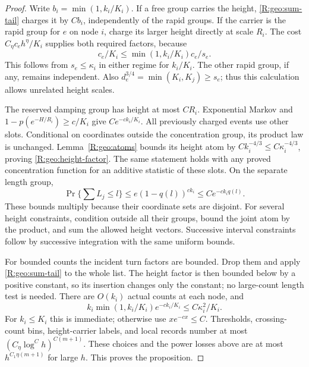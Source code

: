 \begin{proof}
Write $b_i=\min(1,k_i/K_i)$.  If a free group carries the height,
\eqref{R:geo:sum-tail} charges it by $Cb_i$, independently of the
rapid groups.  If the carrier is the rapid group for $e$ on node $i$,
charge its larger height directly at scale $R_i$.  The cost
$C_\eta c_eh^\eta/K_i$ supplies both required factors, because
\begin{equation}\label{R:geo:shared-height-charge}
              c_e/K_i\le \min(1,k_i/K_i)c_e/s_e.
\end{equation}
This follows from $s_e\le\kappa_i$ in either regime for $k_i/K_i$.
The other rapid group, if any, remains independent.  Also
$d_e^{3/4}=\min(K_i,K_j)\ge s_e$; thus this calculation allows
unrelated height scales.

The reserved damping group has height at most $CR_i$.  Exponential
Markov and $1-p(e^{-H/R_i})\ge c/K_i$ give
$C e^{-c k_i/K_i}$.  All previously charged events use other slots.
Conditional on coordinates outside the concentration group, its product
law is unchanged.  Lemma~\ref{R:geo:atoms} bounds its height atom by
$Ck_i^{-4/3}\le C\kappa_i^{-4/3}$, proving
\eqref{R:geo:height-factor}.  The same statement holds with any proved
concentration function for an additive statistic of these slots.  On
the separate length group,
\[
 \Pr\{\textstyle\sum L_j\le l\}
       \le e(1-q(l))^{c k_i}\le C e^{-c k_i q(l)}.
\]
These bounds multiply because their coordinate sets are disjoint.
For several height constraints, condition outside all their groups,
bound the joint atom by the product, and sum the allowed height vectors.
Successive interval constraints follow by successive integration with
the same uniform bounds.

For bounded counts the incident turn factors are bounded.  Drop them
and apply \eqref{R:geo:sum-tail} to the whole list.  The height factor
is then bounded below by a positive constant, so its insertion changes
only the constant; no large-count length test is needed.
There are $O(k_i)$ actual counts at each node, and
\[
 k_i\min(1,k_i/K_i)e^{-c k_i/K_i}\le C\kappa_i^2/K_i.
\]
For $k_i\le K_i$ this is immediate; otherwise use $x e^{-cx}\le C$.
Thresholds, crossing-count bins, height-carrier labels, and local records
number at most $(C_\eta\log^C h)^{C(m+1)}$.  These choices and the
power losses above are at most $h^{C_1\eta(m+1)}$ for large $h$.
This proves the proposition.
\end{proof}

